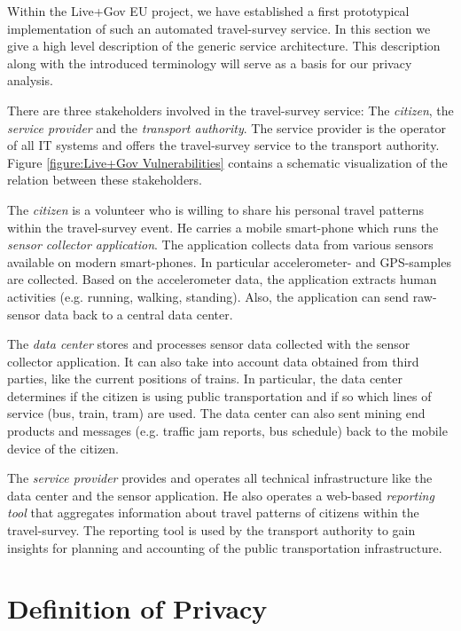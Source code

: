\documentclass[runningheads,a4paper]{llncs}
\begin{document}
Within the Live+Gov EU project, we have established a first
prototypical implementation of such an automated travel-survey
service. In this section we give a high level description of the
generic service architecture. This description along with the
introduced terminology will serve as a basis for our privacy analysis.

There are three stakeholders involved in the travel-survey service:
The \emph{citizen}, the \emph{service provider} and the \emph{transport
  authority}. The service provider is the operator of all IT systems and
offers the travel-survey service to the transport authority. Figure
\ref{figure:Live+Gov Vulnerabilities} contains a schematic
visualization of the relation between these stakeholders.

The \emph{citizen} is a volunteer who is willing to share his personal travel
patterns within the travel-survey event.  He carries a mobile
smart-phone which runs the \emph{sensor collector application}. The
application collects data from various sensors available on modern
smart-phones. In particular accelerometer- and GPS-samples are
collected. Based on the accelerometer data, the application extracts
human activities (e.g. running, walking, standing). Also, the
application can send raw-sensor data back to a central data center.

The \emph{data center} stores and processes sensor data collected with
the sensor collector application. It can also take into account data
obtained from third parties, like the current positions of trains. In
particular, the data center determines if the citizen is using public
transportation and if so which lines of service (bus, train, tram) are
used. The data center can also sent mining end products and messages
(e.g. traffic jam reports, bus schedule) back to the mobile device of
the citizen.

The \emph{service provider} provides and operates all technical
infrastructure like the data center and the sensor application. He
also operates a web-based \emph{reporting tool} that aggregates
information about travel patterns of citizens within the
travel-survey. The reporting tool is used by the transport authority to gain
insights for planning and accounting of the public transportation
infrastructure.






\section{Definition of Privacy}
\label{sec:privacydef}
\end{document}
